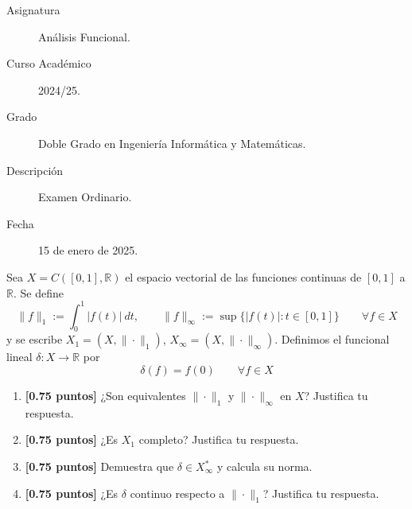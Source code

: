 \documentclass[12pt]{article}
\begin{document}

    
    

    \begin{description}
        \item[Asignatura] Análisis Funcional.
        \item[Curso Académico] 2024/25.
        \item[Grado] Doble Grado en Ingeniería Informática y Matemáticas.
        \item[Descripción] Examen Ordinario.
        \item[Fecha] 15 de enero de 2025.
    
    \end{description}
    \newpage


    
    \begin{ejercicio}[3 puntos]
        Sea $X = C([0,1],\mathbb{R})$ el espacio vectorial de las funciones continuas de $[0,1]$ a $\mathbb{R}$. Se define
        \begin{equation*}
            \|f\|_1 := \int_{0}^{1} |f(t)|~dt , \qquad \|f\|_\infty := \sup\{|f(t)| : t\in [0,1]\}\qquad \forall f\in X
        \end{equation*}
        y se escribe $X_1 = (X,\|\cdot \|_1)$, $X_{\infty} = (X,\|\cdot \|_\infty)$. Definimos el funcional lineal $\delta:X\to \mathbb{R}$ por
        \begin{equation*}
            \delta(f) = f(0) \qquad \forall f\in X
        \end{equation*}
        \begin{enumerate}[label=\alph*)]
            \item \textbf{[0.75 puntos]} ¿Son equivalentes $\|\cdot \|_1$ y $\|\cdot \|_\infty$ en $X$? Justifica tu respuesta.
            \item \textbf{[0.75 puntos]} ¿Es $X_1$ completo? Justifica tu respuesta.
            \item \textbf{[0.75 puntos]} Demuestra que $\delta\in X_\infty^\ast$ y calcula su norma.
            \item \textbf{[0.75 puntos]} ¿Es $\delta$ continuo respecto a $\|\cdot \|_1$? Justifica tu respuesta.
        \end{enumerate}
    \end{ejercicio}
\end{document}

